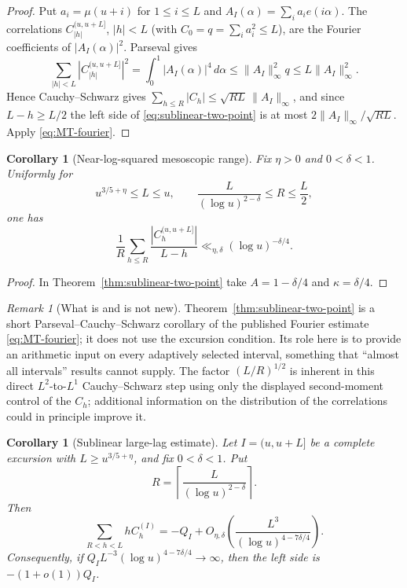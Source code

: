 \documentclass[11pt]{amsart}
\numberwithin{equation}{section}
\theoremstyle{plain}
\newtheorem{corollary}[theorem]{Corollary}
\theoremstyle{definition}
\theoremstyle{remark}
\newtheorem{remark}[theorem]{Remark}
\begin{document}
\begin{proof}
Put $a_i=\mu(u+i)$ for $1\le i\le L$ and
$A_I(\alpha)=\sum_ia_ie(i\alpha)$. The correlations
$C^{(u,u+L]}_{|h|}$, $|h|<L$ (with $C_0=q=\sum_ia_i^2\le L$), are the
Fourier coefficients of $|A_I(\alpha)|^2$. Parseval gives
\[
\sum_{|h|<L}|C^{(u,u+L]}_{|h|}|^2
=\int_0^1|A_I(\alpha)|^4\,d\alpha
\le\|A_I\|_\infty^2q\le L\|A_I\|_\infty^2.
\]
Hence Cauchy--Schwarz gives
$\sum_{h\le R}|C_h|\le\sqrt{RL}\,\|A_I\|_\infty$, and since
$L-h\ge L/2$ the left side of \eqref{eq:sublinear-two-point} is at most
$2\|A_I\|_\infty/\sqrt{RL}$. Apply \eqref{eq:MT-fourier}.
\end{proof}

\begin{corollary}[Near-log-squared mesoscopic range]
\label{cor:near-log2-lags}
Fix $\eta>0$ and $0<\delta<1$. Uniformly for
\[
u^{3/5+\eta}\le L\le u,
\qquad
\frac{L}{(\log u)^{2-\delta}}\le R\le\frac L2,
\]
one has
\[
\frac1R\sum_{h\le R}\frac{|C^{(u,u+L]}_h|}{L-h}
\ll_{\eta,\delta}(\log u)^{-\delta/4}.
\]
\end{corollary}

\begin{proof}
In Theorem~\ref{thm:sublinear-two-point} take
$A=1-\delta/4$ and $\kappa=\delta/4$.
\end{proof}

\begin{remark}[What is and is not new]
\label{rem:sublinear-status}
Theorem~\ref{thm:sublinear-two-point} is a short Parseval--Cauchy--Schwarz
corollary of the published Fourier estimate \eqref{eq:MT-fourier}; it does
not use the excursion condition. Its role here is to provide an arithmetic
input on every adaptively selected interval, something that ``almost all
intervals'' results cannot supply. The factor $(L/R)^{1/2}$ is inherent in
this direct $L^2$-to-$L^1$ Cauchy--Schwarz step using only the displayed
second-moment control of the $C_h$; additional information on the
distribution of the correlations could in principle improve it.
\end{remark}

\begin{corollary}[Sublinear large-lag estimate]
\label{cor:sublinear-large-lag}
Let $I=(u,u+L]$ be a complete excursion with
$L\ge u^{3/5+\eta}$, and fix $0<\delta<1$. Put
\[
R=\left\lceil\frac{L}{(\log u)^{2-\delta}}\right\rceil.
\]
Then
\begin{equation}
\label{eq:sublinear-large-lag}
\sum_{R<h<L}hC_h^{(I)}
=-Q_I+O_{\eta,\delta}\!\left(
\frac{L^3}{(\log u)^{4-7\delta/4}}
\right).
\end{equation}
Consequently, if
$Q_I L^{-3}(\log u)^{4-7\delta/4}\to\infty$, then the left side is
$-(1+o(1))Q_I$.
\end{corollary}
\end{document}
